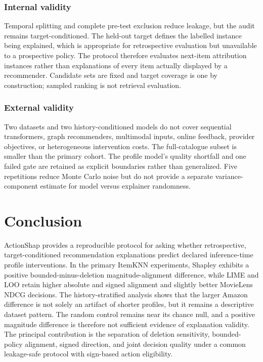 \documentclass[pdflatex,sn-mathphys-num]{sn-jnl}
\begin{document}
\subsubsection{Internal validity}
Temporal splitting and complete pre-test exclusion reduce leakage, but the audit remains target-conditioned. The held-out target defines the labelled instance being explained, which is appropriate for retrospective evaluation but unavailable to a prospective policy. The protocol therefore evaluates next-item attribution instances rather than explanations of every item actually displayed by a recommender. Candidate sets are fixed and target coverage is one by construction; sampled ranking is not retrieval evaluation.

\subsubsection{External validity}
Two datasets and two history-conditioned models do not cover sequential transformers, graph recommenders, multimodal inputs, online feedback, provider objectives, or heterogeneous intervention costs. The full-catalogue subset is smaller than the primary cohort. The profile model’s quality shortfall and one failed gate are retained as explicit boundaries rather than generalized. Five repetitions reduce Monte Carlo noise but do not provide a separate variance-component estimate for model versus explainer randomness.

\section{Conclusion}
ActionShap provides a reproducible protocol for asking whether retrospective, target-conditioned recommendation explanations predict declared inference-time profile interventions. In the primary ItemKNN experiments, Shapley exhibits a positive bounded-minus-deletion magnitude-alignment difference, while LIME and LOO retain higher absolute and signed alignment and slightly better MovieLens NDCG decisions. The history-stratified analysis shows that the larger Amazon difference is not solely an artifact of shorter profiles, but it remains a descriptive dataset pattern. The random control remains near its chance null, and a positive magnitude difference is therefore not sufficient evidence of explanation validity. The principal contribution is the separation of deletion sensitivity, bounded-policy alignment, signed direction, and joint decision quality under a common leakage-safe protocol with sign-based action eligibility.
\end{document}
